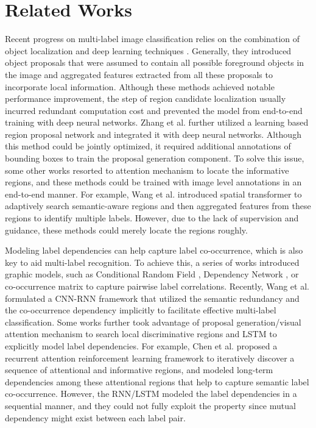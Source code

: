 \documentclass[10pt,twocolumn,letterpaper]{article}
\begin{document}
\section{Related Works}
Recent progress on multi-label image classification relies on the combination of object localization and deep learning techniques \cite{wei2016hcp,yang2016exploit}. Generally, they introduced object proposals \cite{zitnick2014edge} that were assumed to contain all possible foreground objects in the image and aggregated features extracted from all these proposals to incorporate local information. Although these methods achieved notable performance improvement, the step of region candidate localization usually incurred redundant computation cost and prevented the model from end-to-end training with deep neural networks. Zhang et al. \cite{zhang2018multi} further utilized a learning based region proposal network and integrated it with deep neural networks. Although this method could be jointly optimized, it required additional annotations of bounding boxes to train the proposal generation component. To solve this issue, some other works \cite{zhu2017learning,wang2017multi,zhu2017learning} resorted to attention mechanism to locate the informative regions, and these methods could be trained with image level annotations in an end-to-end manner. For example, Wang et al. \cite{wang2017multi} introduced spatial transformer to adaptively search semantic-aware regions and then aggregated features from these regions to identify multiple labels. However, due to the lack of supervision and guidance, these methods could merely locate the regions roughly.

Modeling label dependencies can help capture label co-occurrence, which is also key to aid multi-label recognition. To achieve this, a series of works introduced graphic models, such as Conditional Random Field \cite{ghamrawi2005collective}, Dependency Network \cite{guo2011multi}, or co-occurrence matrix \cite{xue2011correlative} to capture pairwise label correlations. Recently, Wang et al. \cite{wang2016cnn} formulated a CNN-RNN framework that utilized the semantic redundancy and the co-occurrence dependency implicitly to facilitate effective multi-label classification. Some works \cite{zhang2018multi,chen2018recurrent} further took advantage of proposal generation/visual attention mechanism to search local discriminative regions and LSTM \cite{hochreiter1997long} to explicitly model label dependencies. For example, Chen et al. \cite{chen2018recurrent} proposed a recurrent attention reinforcement learning framework to iteratively discover a sequence of attentional and informative regions, and modeled long-term dependencies among these attentional regions that help to capture semantic label co-occurrence. However, the RNN/LSTM \cite{hochreiter1997long} modeled the label dependencies in a sequential manner, and they could not fully exploit the property since mutual dependency might exist between each label pair.
\end{document}
